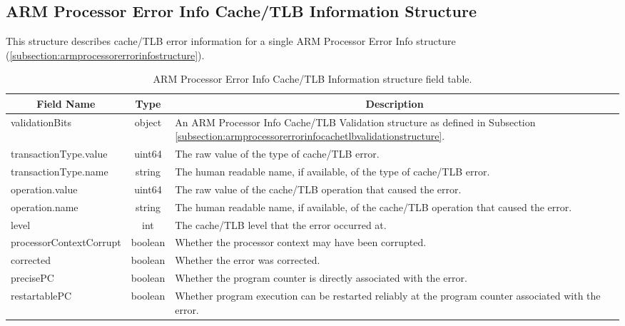 \documentclass{report}
\newcommand*{\thead}[1]{\multicolumn{1}{|c|}{\bfseries #1}}
\newcommand*{\jsontable}[1]{
    \begin{table}[!ht]
    \label{#1}
    \centering
    \begin{adjustbox}{center}
    \begin{tabular}{|l|c|p{8cm}|}
    \hline
    \thead{Field Name} & \thead{Type} & \thead{Description} \\
    \hline
}
\newcommand*{\jsontableend}[1]{
    \hline
    \end{tabular}
    \end{adjustbox}
    \caption{#1}
    \label{table:#1}
    \end{table}
    \FloatBarrier
}
\begin{document}
\subsection{ARM Processor Error Info Cache/TLB Information Structure}
\label{subsection:armprocessorerrorinfoerrorinformationcachetlbstructure}
This structure describes cache/TLB error information for a single ARM Processor Error Info structure (\ref{subsection:armprocessorerrorinfostructure}).
\jsontable{table:armprocessorerrorinfoerrorinformationcachetlbstructure}
validationBits & object & An ARM Processor Info Cache/TLB Validation structure as defined in Subsection \ref{subsection:armprocessorerrorinfocachetlbvalidationstructure}.\\
\hline
transactionType.value & uint64 & The raw value of the type of cache/TLB error.\\
transactionType.name & string & The human readable name, if available, of the type of cache/TLB error.\\
\hline
operation.value & uint64 & The raw value of the cache/TLB operation that caused the error.\\
operation.name & string & The human readable name, if available, of the cache/TLB operation that caused the error.\\
\hline
level & int & The cache/TLB level that the error occurred at.\\
\hline
processorContextCorrupt & boolean & Whether the processor context may have been corrupted.\\
\hline
corrected & boolean & Whether the error was corrected.\\
\hline
precisePC & boolean & Whether the program counter is directly associated with the error.\\
\hline
restartablePC & boolean & Whether program execution can be restarted reliably at the program counter associated with the error.\\
\jsontableend{ARM Processor Error Info Cache/TLB Information structure field table.}

\end{document}
